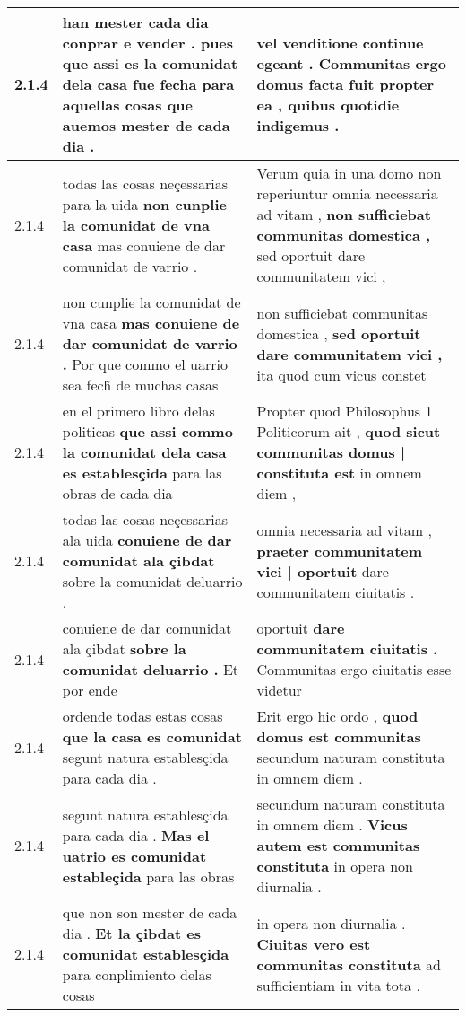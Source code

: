 \begin{tabular}{|p{1cm}|p{6.5cm}|p{6.5cm}|}
2.1.4 & han mester cada dia conprar e vender . \textbf{ pues que assi es la comunidat dela casa fue fecha para aquellas cosas } que auemos mester de cada dia . & vel venditione continue egeant . \textbf{ Communitas ergo domus facta fuit propter ea , } quibus quotidie indigemus . \\\hline
2.1.4 & todas las cosas neçessarias para la uida \textbf{ non cunplie la comunidat de vna casa } mas conuiene de dar comunidat de varrio . & Verum quia in una domo non reperiuntur omnia necessaria ad vitam , \textbf{ non sufficiebat communitas domestica , } sed oportuit dare communitatem vici , \\\hline
2.1.4 & non cunplie la comunidat de vna casa \textbf{ mas conuiene de dar comunidat de varrio . } Por que commo el uarrio sea fech̃ de muchas casas & non sufficiebat communitas domestica , \textbf{ sed oportuit dare communitatem vici , } ita quod cum vicus constet \\\hline
2.1.4 & en el primero libro delas politicas \textbf{ que assi commo la comunidat dela casa es establesçida } para las obras de cada dia & Propter quod Philosophus 1 Politicorum ait , \textbf{ quod sicut communitas domus | constituta est } in omnem diem , \\\hline
2.1.4 & todas las cosas neçessarias ala uida \textbf{ conuiene de dar comunidat ala çibdat } sobre la comunidat deluarrio . & omnia necessaria ad vitam , \textbf{ praeter communitatem vici | oportuit } dare communitatem ciuitatis . \\\hline
2.1.4 & conuiene de dar comunidat ala çibdat \textbf{ sobre la comunidat deluarrio . } Et por ende & oportuit \textbf{ dare communitatem ciuitatis . } Communitas ergo ciuitatis esse videtur \\\hline
2.1.4 & ordende todas estas cosas \textbf{ que la casa es comunidat } segunt natura establesçida para cada dia . & Erit ergo hic ordo , \textbf{ quod domus est communitas } secundum naturam constituta in omnem diem . \\\hline
2.1.4 & segunt natura establesçida para cada dia . \textbf{ Mas el uatrio es comunidat estableçida } para las obras & secundum naturam constituta in omnem diem . \textbf{ Vicus autem est communitas constituta } in opera non diurnalia . \\\hline
2.1.4 & que non son mester de cada dia . \textbf{ Et la çibdat es comunidat establesçida } para conplimiento delas cosas & in opera non diurnalia . \textbf{ Ciuitas vero est communitas constituta } ad sufficientiam in vita tota . \\\hline

\end{tabular}

